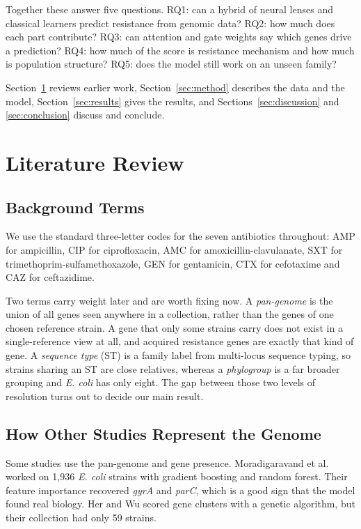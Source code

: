 \documentclass[conference]{IEEEtran}
\begin{document}
Together these answer five questions. RQ1: can a hybrid of neural lenses and
classical learners predict resistance from genomic data? RQ2: how much does each
part contribute? RQ3: can attention and gate weights say which genes drive a
prediction? RQ4: how much of the score is resistance mechanism and how much is
population structure? RQ5: does the model still work on an unseen family?

Section~\ref{sec:lit} reviews earlier work, Section~\ref{sec:method} describes the
data and the model, Section~\ref{sec:results} gives the results, and
Sections~\ref{sec:discussion} and \ref{sec:conclusion} discuss and conclude.

\section{Literature Review}
\label{sec:lit}

\subsection{Background Terms}

We use the standard three-letter codes for the seven antibiotics throughout: AMP
for ampicillin, CIP for ciprofloxacin, AMC for amoxicillin-clavulanate, SXT for
trimethoprim-sulfamethoxazole, GEN for gentamicin, CTX for cefotaxime and CAZ for
ceftazidime.

Two terms carry weight later and are worth fixing now. A \textit{pan-genome} is the
union of all genes seen anywhere in a collection, rather than the genes of one
chosen reference strain. A gene that only some strains carry does not exist in a
single-reference view at all, and acquired resistance genes are exactly that kind of
gene. A \textit{sequence type} (ST) is a family label from multi-locus sequence
typing, so strains sharing an ST are close relatives, whereas a \textit{phylogroup}
is a far broader grouping and \textit{E. coli} has only eight. The gap between those
two levels of resolution turns out to decide our main result.

\subsection{How Other Studies Represent the Genome}

Some studies use the pan-genome and gene presence. Moradigaravand et al.
\cite{moradigaravand2018} worked on 1{,}936 \textit{E. coli} strains with gradient
boosting and random forest. Their feature importance recovered \textit{gyrA} and
\textit{parC}, which is a good sign that the model found real biology. Her and Wu
\cite{her2018} scored gene clusters with a genetic algorithm, but their collection
had only 59 strains.
\end{document}
